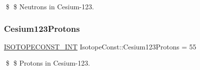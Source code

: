 \$ \$ Neutrons in Cesium-\/123. \mbox{\label{group___isotope_const-_cesium-_cs123_ga84623c3dab39ae53239deff957d131be}} 
\subsubsection{\texorpdfstring{Cesium123\+Protons}{Cesium123Protons}}
{\footnotesize\ttfamily \mbox{\hyperlink{group___isotope_const-_macros_ga5f18360b3e99483a35c32d789e62621c}{I\+S\+O\+T\+O\+P\+E\+C\+O\+N\+S\+T\+\_\+\+I\+NT}} Isotope\+Const\+::\+Cesium123\+Protons = 55}

\$ \$ Protons in Cesium-\/123. 